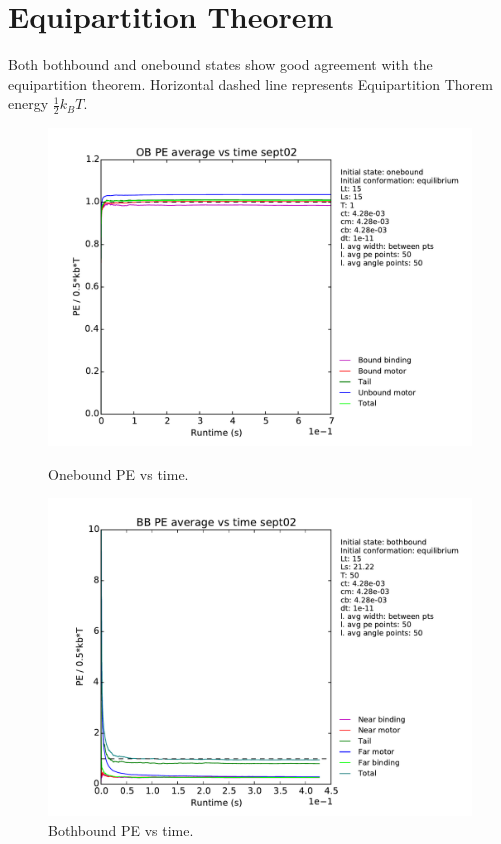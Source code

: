 \documentclass[10pt]{article} %
\begin{document}
\section{Equipartition Theorem}
Both bothbound and onebound states show good agreement with the equipartition theorem. Horizontal dashed line represents Equipartition Thorem energy $\frac{1}{2}k_BT$.

\begin{figure}[h!]
  \centering

  \begin{minipage}[b]{0.49\textwidth}
    \includegraphics[width=\textwidth]{../figures/OB_Average_PE.pdf}
    \caption{Onebound PE vs time.}
  \end{minipage}
  \begin{minipage}[b]{0.49\textwidth}
    \includegraphics[width=\textwidth]{../figures/BB_Average_PE.pdf}
    \caption{Bothbound PE vs time.}
  \end{minipage}
  \label{fig:equipartition_agreement}
\end{figure}
\end{document}
